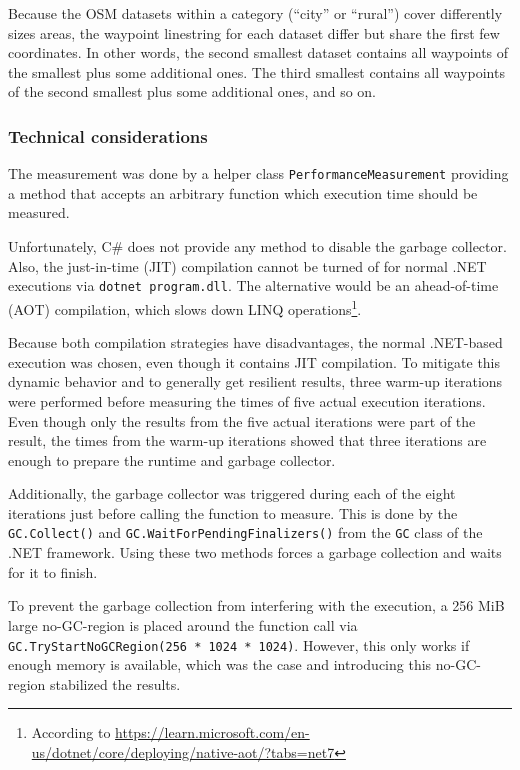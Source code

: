 			Because the OSM datasets within a category (\enquote{city} or \enquote{rural}) cover differently sizes areas, the waypoint linestring for each dataset differ but share the first few coordinates.
			In other words, the second smallest dataset contains all waypoints of the smallest plus some additional ones.
			The third smallest contains all waypoints of the second smallest plus some additional ones, and so on.
		
		\subsubsection{Technical considerations}
		
			The measurement was done by a helper class \texttt{PerformanceMeasurement} providing a method that accepts an arbitrary function which execution time should be measured.
			
			Unfortunately, C\# does not provide any method to disable the garbage collector.
			Also, the just-in-time (JIT) compilation cannot be turned of for normal .NET executions via \texttt{dotnet program.dll}.
			The alternative would be an ahead-of-time (AOT) compilation, which slows down LINQ operations\footnote{According to \url{https://learn.microsoft.com/en-us/dotnet/core/deploying/native-aot/?tabs=net7}}.

			Because both compilation strategies have disadvantages, the normal .NET-based execution was chosen, even though it contains JIT compilation.
			To mitigate this dynamic behavior and to generally get resilient results, three warm-up iterations were performed before measuring the times of five actual execution iterations.
			Even though only the results from the five actual iterations were part of the result, the times from the warm-up iterations showed that three iterations are enough to prepare the runtime and garbage collector.
			
			Additionally, the garbage collector was triggered during each of the eight iterations just before calling the function to measure.
			This is done by the \texttt{GC.Collect()} and \texttt{GC.WaitForPendingFinalizers()} from the \texttt{GC} class of the .NET framework.
			Using these two methods forces a garbage collection and waits for it to finish\cite{ms-gc}.
			
			To prevent the garbage collection from interfering with the execution, a 256 MiB large no-GC-region is placed around the function call via \texttt{GC.TryStartNoGCRegion(256 * 1024 * 1024)}.
			However, this only works if enough memory is available\cite{ms-no-gc-region}, which was the case and introducing this no-GC-region stabilized the results.
			
